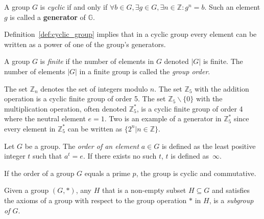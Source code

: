 \begin{defn}
\label{def:cyclic_group}
 A group $G$ is \textit{cyclic} if and only if $\forall b \in G, \exists g \in G,\exists n \in \mathbb{Z}: g^n = b$. Such an element $g$ is called a \textbf{generator} of $\mathbb{G}$.
\end{defn}

Definition~\ref{def:cyclic_group} implies that in a cyclic group every element can be written as a power of one of the group's generators.

\begin{defn}
\label{def:finite_group}
 A group $G$ is \textit{finite} if the number of elements in $G$ denoted $|G|$ is finite. The number of elements $|G|$ in a finite group is called the \textit{group order}.
\end{defn}

The set $\mathbb{Z}_n$ denotes the set of integers modulo $n$. The set $\mathbb{Z}_5$ with the addition operation is a cyclic finite group of order 5. The set $\mathbb{Z}_5 \backslash \{0\}$ with the multiplication operation, often denoted $\mathbb{Z}^{*}_5$, is a cyclic finite group of order 4 where the neutral element $e=1$. Two is an example of a generator in $\mathbb{Z}^{*}_5$ since every element in $\mathbb{Z}^{*}_5$ can be written as $\{ 2^n | n \in \mathbb{Z} \}$.

\begin{defn}
\label{def:order_of_an_element}
Let $G$ be a group. The \textit{order of an element} $a \in G$ is defined as the least positive integer $t$ such that $a^t = e$. If there exists no such $t$, $t$ is defined as~$\infty$.
\end{defn}

\begin{thm}
\label{the:group_modulo_a_prime}
If the order of a group $G$ equals a prime $p$, the group is cyclic and commutative.
\end{thm}

\begin{defn}[Subgroup]
\label{def:subgroup}
 Given a group $\left( G, * \right)$, any $H$ that is a non-empty subset $H \subseteq G$ and satisfies the axioms of a group with respect to the group operation $*$ in $H$, is a \textit{subgroup of $G$}.
\end{defn}

